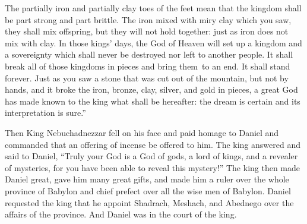 \begin{inparaenum}
   The partially iron and partially clay toes of the feet mean that the kingdom shall be part strong and part brittle.%
   The iron mixed with miry clay which you saw, they shall mix offspring, but they will not hold together: just as iron does not mix with clay.%
   In those kings' days, the God of Heaven will set up a kingdom and a sovereignty which shall never be destroyed nor left to another people. It shall break all of those kingdoms in pieces and bring them\understood\ to an end. It shall stand forever.%
   Just as you saw a stone that was cut out of the mountain, but not by hands, and it broke the iron, bronze, clay, silver, and gold in pieces, a great God has made known to the king what shall be hereafter: the dream is certain and its interpretation is sure.''%
  
   Then King Nebuchadnezzar fell on his face and paid homage to Daniel and commanded that an offering of incense be offered to him.%
   The king answered and said to Daniel, ``Truly your God is a God of gods, a lord of kings, and a revealer of mysteries, for you have been able to reveal this mystery!''%
   The king then made Daniel great, gave him many great gifts, and made him a ruler over the whole province of Babylon and chief prefect over all the wise men of Babylon.%
   Daniel requested the king that he appoint Shadrach, Meshach, and Abednego over the affairs of the province. And Daniel was in the court of the king.%
\end{inparaenum}
